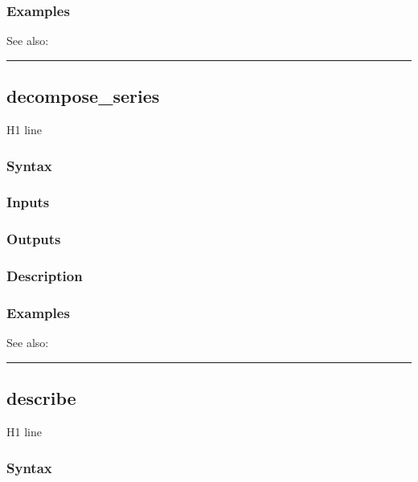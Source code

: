\documentclass[letterpaper,10pt,english]{sphinxmanual}
\begin{document}
\subsubsection{Examples}
\label{classes/time_series/@ts/ts:id168}
See also:


\bigskip\hrule{}\bigskip



\subsection{decompose\_series}
\label{classes/time_series/@ts/ts:id169}\label{classes/time_series/@ts/ts:decompose-series}
H1 line


\subsubsection{Syntax}
\label{classes/time_series/@ts/ts:id170}

\subsubsection{Inputs}
\label{classes/time_series/@ts/ts:id171}

\subsubsection{Outputs}
\label{classes/time_series/@ts/ts:id172}

\subsubsection{Description}
\label{classes/time_series/@ts/ts:id173}

\subsubsection{Examples}
\label{classes/time_series/@ts/ts:id174}
See also:


\bigskip\hrule{}\bigskip



\subsection{describe}
\label{classes/time_series/@ts/ts:id175}\label{classes/time_series/@ts/ts:describe}
H1 line


\subsubsection{Syntax}
\label{classes/time_series/@ts/ts:id176}
\end{document}
